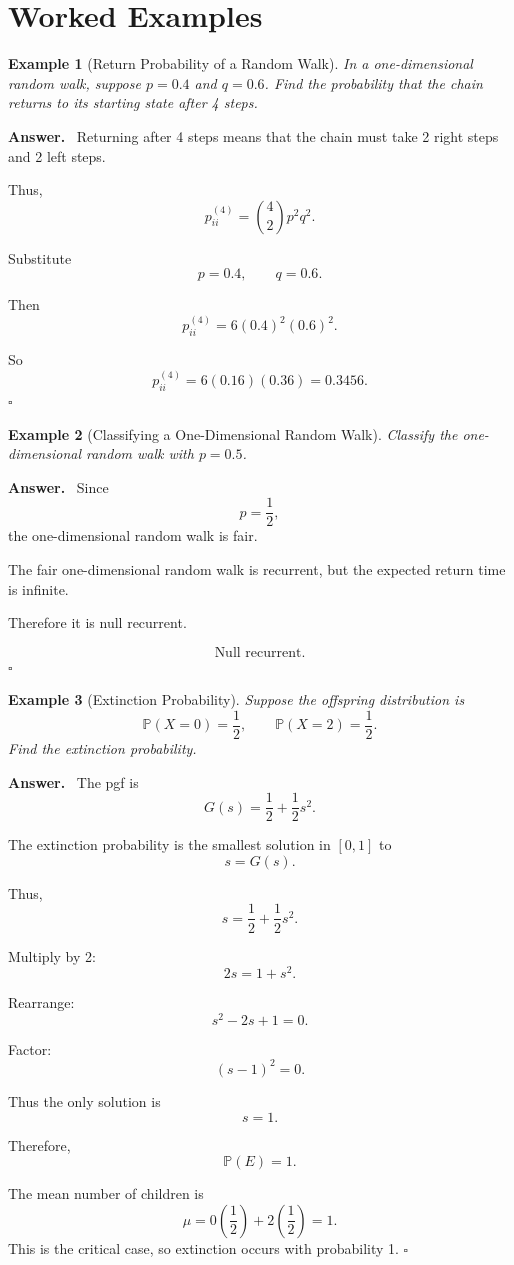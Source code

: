 \documentclass[12pt,a4paper]{article}
\theoremstyle{lecturestyle}
\newtheorem{example}{Example}
\newenvironment{answer}
{\par\textbf{Answer.}\ }
{\hfill$\square$\par}
\newcommand{\Prob}{\mathbb{P}}
\begin{document}
\section{Worked Examples}

\begin{example}[Return Probability of a Random Walk]
In a one-dimensional random walk, suppose $p=0.4$ and $q=0.6$. Find the probability that the chain returns to its starting state after 4 steps.
\end{example}

\begin{answer}
Returning after 4 steps means that the chain must take 2 right steps and 2 left steps.

Thus,
\[
p_{ii}^{(4)}
=
\binom{4}{2}p^2q^2.
\]

Substitute
\[
p=0.4,
\qquad
q=0.6.
\]

Then
\[
p_{ii}^{(4)}
=
6(0.4)^2(0.6)^2.
\]

So
\[
p_{ii}^{(4)}
=
6(0.16)(0.36)
=
0.3456.
\]
\end{answer}

\begin{example}[Classifying a One-Dimensional Random Walk]
Classify the one-dimensional random walk with $p=0.5$.
\end{example}

\begin{answer}
Since
\[
p=\frac12,
\]
the one-dimensional random walk is fair.

The fair one-dimensional random walk is recurrent, but the expected return time is infinite.

Therefore it is null recurrent.

\[
\boxed{\text{Null recurrent}.}
\]
\end{answer}

\begin{example}[Extinction Probability]
Suppose the offspring distribution is
\[
\Prob(X=0)=\frac12,
\qquad
\Prob(X=2)=\frac12.
\]
Find the extinction probability.
\end{example}

\begin{answer}
The pgf is
\[
G(s)=\frac12+\frac12s^2.
\]

The extinction probability is the smallest solution in $[0,1]$ to
\[
s=G(s).
\]

Thus,
\[
s=\frac12+\frac12s^2.
\]

Multiply by 2:
\[
2s=1+s^2.
\]

Rearrange:
\[
s^2-2s+1=0.
\]

Factor:
\[
(s-1)^2=0.
\]

Thus the only solution is
\[
s=1.
\]

Therefore,
\[
\boxed{\Prob(E)=1.}
\]

The mean number of children is
\[
\mu=0\left(\frac12\right)+2\left(\frac12\right)=1.
\]
This is the critical case, so extinction occurs with probability 1.
\end{answer}
\end{document}
